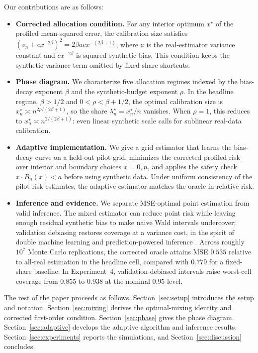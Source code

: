 Our contributions are as follows:
\begin{itemize}[leftmargin=*]
  \item \textbf{Corrected allocation condition.} For any interior optimum $x^\star$ of the profiled mean-squared error, the calibration size satisfies
    $(v_n + c x^{-2\beta})^2 = 2\beta a c x^{-(2\beta+1)}$,
    where $a$ is the real-estimator variance constant and $c x^{-2\beta}$ is squared synthetic bias. This condition keeps the synthetic-variance term omitted by fixed-share shortcuts.

  \item \textbf{Phase diagram.} We characterize five allocation regimes indexed by the bias-decay exponent $\beta$ and the synthetic-budget exponent $\rho$. In the headline regime, $\beta>1/2$ and $0<\rho<\beta+1/2$, the optimal calibration size is $x_n^\star \asymp n^{2\rho/(2\beta+1)}$, so the share $\lambda_n^\star=x_n^\star/n$ vanishes. When $\rho=1$, this reduces to $x_n^\star \asymp n^{2/(2\beta+1)}$: even linear synthetic scale calls for sublinear real-data calibration.

  \item \textbf{Adaptive implementation.} We give a grid estimator that learns the bias-decay curve on a held-out pilot grid, minimizes the corrected profiled risk over interior and boundary choices $x=0,n$, and applies the safety check $x \cdot B_n(x) < a$ before using synthetic data. Under uniform consistency of the pilot risk estimates, the adaptive estimator matches the oracle in relative risk.

  \item \textbf{Inference and evidence.} We separate MSE-optimal point estimation from valid inference. The mixed estimator can reduce point risk while leaving enough residual synthetic bias to make naive Wald intervals undercover; validation debiasing restores coverage at a variance cost, in the spirit of double machine learning and prediction-powered inference \citep{chernozhukov2018doubleml,angelopoulos2023ppi}. Across roughly $10^7$ Monte Carlo replications, the corrected oracle attains MSE $0.535$ relative to all-real estimation in the headline cell, compared with $0.779$ for a fixed-share baseline. In Experiment~4, validation-debiased intervals raise worst-cell coverage from $0.855$ to $0.938$ at the nominal $0.95$ level.
\end{itemize}

The rest of the paper proceeds as follows. Section~\ref{sec:setup} introduces the setup and notation. Section~\ref{sec:mixing} derives the optimal-mixing identity and corrected first-order condition. Section~\ref{sec:phase} gives the phase diagram. Section~\ref{sec:adaptive} develops the adaptive algorithm and inference results. Section~\ref{sec:experiments} reports the simulations, and Section~\ref{sec:discussion} concludes.
